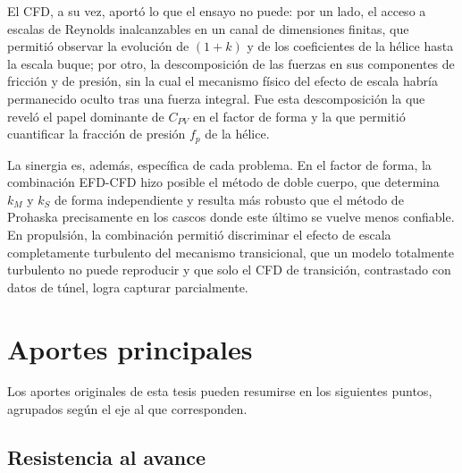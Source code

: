 El CFD, a su vez, aportó lo que el ensayo no puede: por un lado, el acceso a escalas
de Reynolds inalcanzables en un canal de dimensiones finitas, que permitió observar
la evolución de $(1+k)$ y de los coeficientes de la hélice hasta la escala buque; por
otro, la descomposición de las fuerzas en sus componentes de fricción y de presión,
sin la cual el mecanismo físico del efecto de escala habría permanecido oculto tras
una fuerza integral. Fue esta descomposición la que reveló el papel dominante de
$C_{PV}$ en el factor de forma y la que permitió cuantificar la fracción de presión
$f_p$ de la hélice.

La sinergia es, además, específica de cada problema. En el factor de forma, la
combinación EFD-CFD hizo posible el método de doble cuerpo, que determina $k_M$ y
$k_S$ de forma independiente y resulta más robusto que el método de Prohaska
precisamente en los cascos donde este último se vuelve menos confiable. En
propulsión, la combinación permitió discriminar el efecto de escala completamente
turbulento del mecanismo transicional, que un modelo totalmente turbulento no puede
reproducir y que solo el CFD de transición, contrastado con datos de túnel, logra
capturar parcialmente.

\section{Aportes principales}

Los aportes originales de esta tesis pueden resumirse en los siguientes puntos,
agrupados según el eje al que corresponden.

\subsection*{Resistencia al avance}

